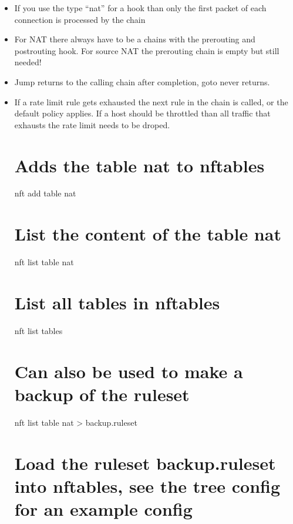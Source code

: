 \begin{itemize}
\item
  If you use the type ``nat'' for a hook than only the first packet of
  each connection is processed by the chain
\item
  For NAT there always have to be a chains with the prerouting and
  postrouting hook. For source NAT the prerouting chain is empty but
  still needed!
\item
  Jump returns to the calling chain after completion, goto never
  returns.
\item
  If a rate limit rule gets exhausted the next rule in the chain is
  called, or the default policy applies. If a host should be throttled
  than all traffic that exhausts the rate limit needs to be droped.

  \section{Adds the table nat to
  nftables}\label{adds-the-table-nat-to-nftables}

  nft add table nat

  \section{List the content of the table
  nat}\label{list-the-content-of-the-table-nat}

  nft list table nat

  \section{List all tables in
  nftables}\label{list-all-tables-in-nftables}

  nft list tables

  \section{Can also be used to make a backup of the
  ruleset}\label{can-also-be-used-to-make-a-backup-of-the-ruleset}

  nft list table nat \textgreater{} backup.ruleset

  \section{Load the ruleset backup.ruleset into nftables, see the tree
  config for an example
  config}\label{load-the-ruleset-backup.ruleset-into-nftables-see-the-tree-config-for-an-example-config}


\end{itemize}
